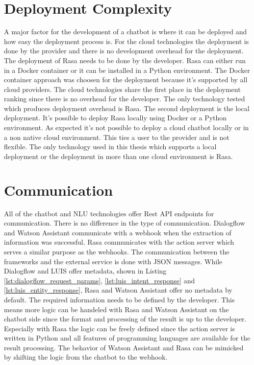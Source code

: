 \section*{Deployment Complexity}
A major factor for the development of a chatbot is where it can be deployed and how easy the 
deployment process is.
For the cloud technologies the deployment is done by the provider and there is no development overhead for 
the deployment.
The deployment of Rasa needs to be done by the developer.
Rasa can either run in a Docker container or it can be installed in a Python environment.
The Docker container approach was choosen for the deployment because it's supported by 
all cloud providers.
The cloud technologies share the first place in the deployment ranking since there is no overhead for the 
developer.
The only technology tested which produces deployment overhead is Rasa. 
The second deployment is the local deployment.
It's possible to deploy Rasa locally using Docker or a Python environment.
As expected it's not possible to deploy a cloud chatbot locally or in a non native cloud environment.
This ties a user to the provider and is not flexible.
The only technology used in this thesis which supports a local deployment or the deployment in 
more than one cloud environment is Rasa. 

\section*{Communication}
All of the chatbot and NLU technologies offer Rest API endpoints for communication.
There is no difference in the type of communication.
Dialogflow and Watson Assistant communicate with a webhook when the extraction 
of information was successful.
Rasa communicates with the action server which serves a similar purpose as the webhooks.
The communication between the frameworks and the external service is done with 
JSON messages.
While Dialogflow and LUIS offer metadata, shown in Listing \ref{lst:dialogflow_request_params}, \ref{lst:luis_intent_response}
and \ref{lst:luis_entity_response}, Rasa and Watson Assistant offer no metadata by default.
The required information needs to be defined by the developer.
This means more logic can be handeled with Rasa and Watson Assistant on the chatbot side since the 
format and processing of the result is up to the developer.
Especially with Rasa the logic can be freely defined since the action server is written in Python and 
all features of programming languages are available for the result processing.
The behavior of Watson Assistant and Rasa can be mimicked by shifting the logic from the chatbot to the webhook.

